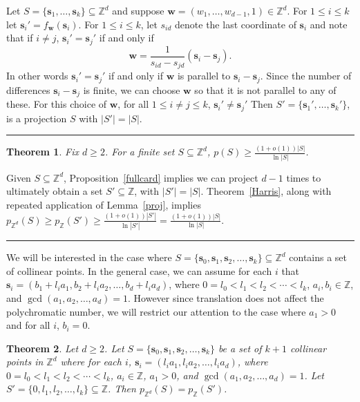 \documentclass[12pt]{article}
\newenvironment{proof}{{\bf Proof:  }}{\hfill\rule{2mm}{2mm}}
\newtheorem{theorem}{Theorem}
\newcommand{\Z}{\ensuremath{\mathbb Z}}
\newcommand{\vect}[1]{\bm{#1}}
\begin{document}
\begin{proof}
Let $S =\{\vect{s}_1, \ldots, \vect{s}_k\} \subseteq \Z^d$ and suppose $\vect{w} = (w_1, \ldots, w_{d-1},1) \in \Z^d$. For $1 \le i \le k$ let $\vect{s}_i'=f_{\vect{w}}(\vect{s}_i)$. For $1 \le i \le k$, let $s_{id}$ denote the last coordinate of $\vect{s}_i$ and note that if $i \neq j$, $\vect{s}_i' = \vect{s}_j'$ if and only if 
\[\vect{w} = \frac{1}{s_{id}-s_{jd}}(\vect{s}_i - \vect{s}_j).\]
In other words $\vect{s}_i' = \vect{s}_j'$ if and only if $\vect{w}$ is parallel to $\vect{s}_i - \vect{s}_j$.  Since the number of differences $\vect{s}_i - \vect{s}_j$ is finite, we can choose $\vect{w}$ so that it is not parallel to any of these. For this choice of $\vect{w}$, for all $1\le i\neq j \le k$, $\vect{s}_i' \neq \vect{s}_j'$ Then $S' = \{\vect{s}_1', \ldots, \vect{s}_k'\}$, is a projection $S$ with $|S'| = |S|$.
\end{proof}

\begin{theorem}\label{hsd}
Fix $d \ge 2$. For a finite set $S \subseteq \Z^d$, $p(S) \ge \frac{(1+o(1))|S|}{\ln|S|}$.
\end{theorem}

\begin{proof}
Given $S \subseteq \Z^d$, Proposition~\ref{fullcard} implies we can project $d-1$ times to ultimately obtain a set $S' \subseteq \Z$, with $|S'|=|S|$.  Theorem~\ref{Harris}, along with repeated application of Lemma~\ref{proj}, implies $p_{\Z^d}(S) \ge p_{\Z}(S') \ge \frac{(1+o(1))|S'|}{\ln|S'|} = \frac{(1+o(1))|S|}{\ln|S|}$.
\end{proof}


We will be interested in the case where $S= \{\vect{s}_0, \vect{s}_1, \vect{s}_2, \ldots, \vect{s}_k\}\subseteq \Z^d$ contains a set of collinear points.  In the general case, we can assume for each $i$ that $\vect{s}_i = (b_1 + l_ia_1, b_2+ l_i a_2, \ldots, b_d + l_ia_d)$, where $0=l_0 <l_1 < l_2 < \cdots <l_k$, $a_i, b_i \in \Z$, and $\gcd(a_1, a_2, \ldots, a_d)=1$.  However since translation does not affect the polychromatic number, we will restrict our attention to the case where $a_1 > 0$ and for all $i$, $b_i=0$.

\begin{theorem}\label{pcolzd}
Let $d \ge 2$. Let $S = \{\vect{s}_0, \vect{s}_1, \vect{s}_2, \ldots, \vect{s}_k\}$ be a set of $k+1$ collinear points in $\Z^d$ where for each $i$, $\vect{s}_i = (l_ia_1, l_i a_2, \ldots, l_ia_d)$, where $0=l_0 <l_1 < l_2 < \cdots <l_k$, $a_i \in \Z$, $a_1 > 0$, and $\gcd(a_1, a_2, \ldots, a_d)=1$.  Let $S' = \{0, l_1, l_2, \ldots, l_k\} \subseteq \Z$.  Then $p_{\Z^d}(S) = p_{\Z}(S')$.
\end{theorem}
\end{document}
